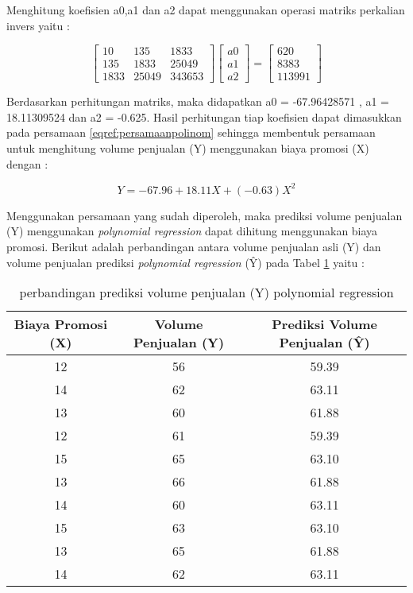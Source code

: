 Menghitung koefisien a0,a1 dan a2 dapat menggunakan operasi matriks perkalian invers yaitu : 

\begin{displaymath}
			\begin{bmatrix}
			10 & 135 & 1833 \\
			135  & 1833 & 25049 \\
			1833 & 25049 & 343653 
			\end{bmatrix}
			\begin{bmatrix}
			a0 \\ 
			a1 \\ 
			a2
			\end{bmatrix}
			=
			\begin{bmatrix}
				 620\\
				8383 \\
				 113991
			\end{bmatrix}
\end{displaymath}

Berdasarkan perhitungan matriks, maka didapatkan a0 = -67.96428571 , a1 = 18.11309524  dan a2 = -0.625. Hasil perhitungan tiap koefisien dapat dimasukkan pada persamaan \ref{eqref:persamaanpolinom} sehingga membentuk persamaan untuk menghitung volume penjualan (Y) menggunakan biaya promosi (X) dengan :


\begin{displaymath}
 Y = -67.96 + 18.11X + (-0.63)X^2 
\end{displaymath}


Menggunakan persamaan yang sudah diperoleh, maka prediksi volume penjualan (Y) menggunakan \textit{polynomial regression} dapat dihitung menggunakan biaya promosi. Berikut adalah  perbandingan antara volume penjualan asli (Y) dan volume penjualan prediksi \textit{polynomial regression} (\^{Y}) pada Tabel \ref{tab:perbandinganpolynomialregression} yaitu :

\begin{table}[ht]
\centering
\begin{tabular}{|c|c|c|}
\hline 
Biaya Promosi (X) & Volume Penjualan (Y) & Prediksi Volume Penjualan (\^{Y})  \\ 
\hline 
12 & 56 & 59.39 \\ 
\hline 
14 & 62 & 63.11 \\ 
\hline 
13 & 60 & 61.88 \\ 
\hline 
12 & 61 & 59.39 \\ 
\hline 
15 & 65 & 63.10 \\ 
\hline 
13 & 66 & 61.88 \\ 
\hline 
14 & 60 & 63.11 \\ 
\hline 
15 & 63 & 63.10 \\ 
\hline 
13 & 65 & 61.88 \\ 
\hline 
14 & 62 & 63.11 \\ 
\hline 
\end{tabular} 
\caption{perbandingan prediksi volume penjualan (Y) polynomial regression}
\label{tab:perbandinganpolynomialregression}
\end{table}


